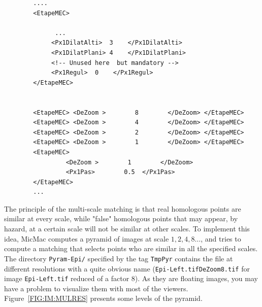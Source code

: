 {\scriptsize
\begin{verbatim}
        ....
        <EtapeMEC>

              ...
             <Px1DilatAlti>  3    </Px1DilatAlti>
             <Px1DilatPlani> 4    </Px1DilatPlani>
             <!-- Unused here  but mandatory -->
             <Px1Regul>  0    </Px1Regul>
        </EtapeMEC>


        <EtapeMEC> <DeZoom >        8        </DeZoom> </EtapeMEC>
        <EtapeMEC> <DeZoom >        4        </DeZoom> </EtapeMEC>
        <EtapeMEC> <DeZoom >        2        </DeZoom> </EtapeMEC>
        <EtapeMEC> <DeZoom >        1        </DeZoom> </EtapeMEC>
        <EtapeMEC>
                 <DeZoom >        1        </DeZoom>
                 <Px1Pas>        0.5  </Px1Pas>
        </EtapeMEC>
        ...

\end{verbatim}
}

The principle of the multi-scale matching is that real homologous points are similar
at every scale, while "false" homologous points that may appear, by hazard, at a certain
scale will not be similar at other scales. To implement this idea, MicMac computes
a pyramid of images at scale $1,2,4,8 \dots$, and tries to compute a matching that
selects points who are similar in all the specified scales. The directory
{\tt Pyram-Epi/} specified by the tag {\tt TmpPyr} contains the file at different
resolutions with a quite obvious name ({\tt Epi-Left.tifDeZoom8.tif}  for
image {\tt Epi-Left.tif} reduced of a factor $8$). As they are floating images,
you may have a problem to visualize them with most of the viewers. Figure~\ref{FIG:IM:MULRES}
presents some levels of the pyramid.


